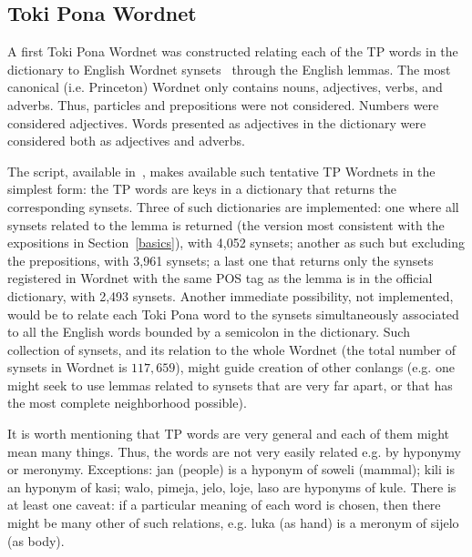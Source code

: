 \subsection{Toki Pona Wordnet}\label{wn}
A first Toki Pona Wordnet was constructed
relating each of the TP words in the dictionary
to English Wordnet synsets~\cite{wordnet}
through the English lemmas.
The most canonical (i.e. Princeton) Wordnet only contains nouns,
adjectives, verbs, and adverbs.
Thus, particles and prepositions were not considered.
Numbers were considered adjectives.
Words presented as adjectives in the dictionary
were considered both as adjectives and adverbs.~\cite{wordnet}

The  script, available in~\cite{tokipona},
makes available such tentative TP Wordnets in the simplest form:
the TP words are keys in a dictionary that returns the
corresponding synsets.
Three of such dictionaries are implemented:
one where all synsets related to the lemma is
returned (the version most consistent
with the expositions in Section~\ref{basics}),
with 4,052 synsets;
another as such but excluding the prepositions,
with 3,961 synsets;
a last one that returns only the synsets
registered in Wordnet with the same POS tag as the lemma
is in the official dictionary,
with 2,493 synsets. 
Another immediate possibility, not implemented,
would be to relate each Toki Pona word to the synsets
simultaneously associated to all the English
words bounded by a semicolon in the dictionary.
Such collection of synsets, and its relation to the whole
Wordnet
(the total number of synsets in Wordnet is $117,659$),
might guide creation of other conlangs
(e.g. one might seek to use lemmas related to synsets that
are very far apart, or that has the most complete neighborhood
possible).

It is worth mentioning that TP words are very general
and each of them might mean many things.
Thus, the words are not very easily related e.g. by hyponymy
or meronymy.
Exceptions: jan (people) is a hyponym of soweli (mammal);
kili is an hyponym of kasi;
walo, pimeja, jelo, loje, laso
are hyponyms of kule.
There is at least one caveat:
if a particular meaning of each word is chosen,
then there might be many other of such relations,
e.g. 
luka (as hand) is a meronym of sijelo (as body).

